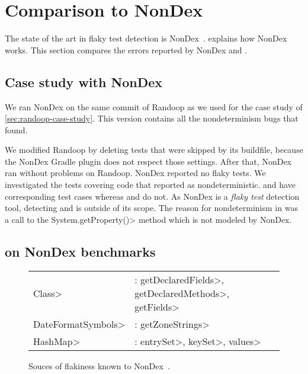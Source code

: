 \section{Comparison to NonDex}

The state of the art in flaky test detection is NonDex~\cite{nondex}.
 explains how NonDex works. This section compares the
errors reported by NonDex and \theDeterminismChecker.

\subsection{Case study with NonDex}\label{sec:nondex-randoop}

We ran NonDex on the same commit of Randoop as we used for the case study
of \cref{sec:randoop-case-study}.  This version contains all the nondeterminism bugs that
\theDeterminismChecker found.

We modified Randoop by deleting tests that were skipped by its buildfile,
because the NonDex Gradle plugin does not respect those settings.
After that, NonDex ran without problems on Randoop.
NonDex reported no flaky tests.
We investigated the tests covering code that \theDeterminismChecker reported as nondeterministic.
\bugHashSet and \bugClasspath have corresponding test cases whereas \bugTimestampOutput and 
\bugTimestampOutput do not.
As NonDex is a \textit{flaky test} detection tool, detecting \bugTimestampOutput and \bugTimestampOutput 
is outside of its scope.
The reason for nondeterminism in \bugClasspath was a call to the \<System.getProperty()> method which
is not modeled by NonDex.


\subsection{\TheDeterminismChecker on NonDex benchmarks}\label{sec:nondex-benchmarks}

\begin{figure}
    \begin{tabular}{lll}
        \<Class> & : \<getDeclaredFields>, \<getDeclaredMethods>, \<getFields> \\
        \<DateFormatSymbols> & : \<getZoneStrings> \\
        \<HashMap> & : \<entrySet>, \<keySet>, \<values>
    \end{tabular}
\caption{Souces of flakiness known to NonDex~\cite{nondex}.}
\label{fig:flaky-sources}
\end{figure}

